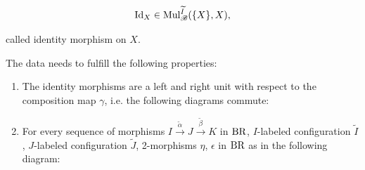 \begin{defin}
\begin{enumerate}[(i)]
        $$\operatorname{Id}_X \in \operatorname{Mul}_{\mathscr{B}}^{\widetilde{I}}(\{X\}, X),$$

        called identity morphism on $X$.
        \end{enumerate}
        The data needs to fulfill the following properties:
        \begin{enumerate}
            \item The identity morphisms are a left and right unit with respect
        to the composition map $\gamma$, i.e. the following diagrams commute:
        \begin{center}
        \end{center}
       
        \begin{center}
        \end{center}

        
        
    
        \item For every sequence of morphisms $I
        \overset{\widetilde{\alpha}}{\to} J \overset{\widetilde{\beta}}{\to} K$
        in $\operatorname{BR}$, $I$-labeled configuration $\widetilde{I}$, $J$-labeled
        configuration $\widetilde{J}$, 2-morphisms $\eta$, $\epsilon$ in $\operatorname{BR}$
        as in the following diagram:


\end{enumerate}
\end{defin}

